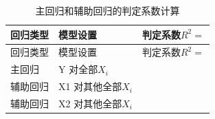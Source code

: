 \documentclass[12pt,(landscape,a4paper),(portrait,a4paper)]{article}
\begin{document}
\begin{longtable}[]{@{}llc@{}}
\caption{主回归和辅助回归的判定系数计算}\tabularnewline
\toprule
\begin{minipage}[b]{0.15\columnwidth}\raggedright
回归类型\strut
\end{minipage} & \begin{minipage}[b]{0.55\columnwidth}\raggedright
模型设置\strut
\end{minipage} & \begin{minipage}[b]{0.20\columnwidth}\centering
判定系数\(R^2=\)\strut
\end{minipage}\tabularnewline
\midrule
\endfirsthead
\toprule
\begin{minipage}[b]{0.15\columnwidth}\raggedright
回归类型\strut
\end{minipage} & \begin{minipage}[b]{0.55\columnwidth}\raggedright
模型设置\strut
\end{minipage} & \begin{minipage}[b]{0.20\columnwidth}\centering
判定系数\(R^2=\)\strut
\end{minipage}\tabularnewline
\midrule
\endhead
\begin{minipage}[t]{0.15\columnwidth}\raggedright
主回归\strut
\end{minipage} & \begin{minipage}[t]{0.55\columnwidth}\raggedright
Y 对全部\(X_i\)\strut
\end{minipage} & \begin{minipage}[t]{0.20\columnwidth}\centering
\strut
\end{minipage}\tabularnewline
\begin{minipage}[t]{0.15\columnwidth}\raggedright
辅助回归\strut
\end{minipage} & \begin{minipage}[t]{0.55\columnwidth}\raggedright
X1 对其他全部\(X_i\)\strut
\end{minipage} & \begin{minipage}[t]{0.20\columnwidth}\centering
\strut
\end{minipage}\tabularnewline
\begin{minipage}[t]{0.15\columnwidth}\raggedright
辅助回归\strut
\end{minipage} & \begin{minipage}[t]{0.55\columnwidth}\raggedright
X2 对其他全部\(X_i\)\strut
\end{minipage} & \begin{minipage}[t]{0.20\columnwidth}\centering

\end{minipage}
\end{longtable}
\end{document}
